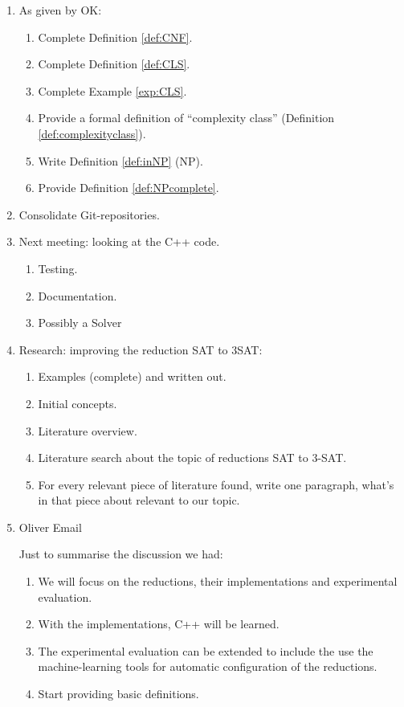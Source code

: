 \documentclass[a4paper]{report}
\begin{document}
\begin{enumerate}
\item As given by OK:
  \begin{enumerate}
  \item Complete Definition \ref{def:CNF}.
  \item Complete Definition \ref{def:CLS}.
  \item Complete Example \ref{exp:CLS}.
  \item Provide a formal definition of ``complexity class'' (Definition \ref{def:complexityclass}).
  \item Write Definition \ref{def:inNP} (NP).
  \item Provide Definition \ref{def:NPcomplete}.
  \end{enumerate}
\item Consolidate Git-repositories.
\item Next meeting: looking at the C++ code.
  \begin{enumerate}
  \item Testing.
  \item Documentation.
  \item Possibly a Solver
  \end{enumerate}
\item Research: improving the reduction SAT to 3SAT:
  \begin{enumerate}
  \item Examples (complete) and written out.
  \item Initial concepts.
  \item Literature overview.
  \item Literature search about the topic of reductions SAT to 3-SAT.
  \item For every relevant piece of literature found, write one paragraph, what's in that piece about relevant to our topic.
  \end{enumerate}
\item Oliver Email

  Just to summarise the discussion we had:
  \begin{enumerate}
     \item We will focus on the reductions, their implementations and experimental evaluation.
    \item With the implementations, C++ will be learned.
    \item The experimental evaluation can be extended to include the use the machine-learning tools for automatic configuration of the reductions.
    \item Start providing basic definitions.
  \end{enumerate}
\end{enumerate}
\end{document}
